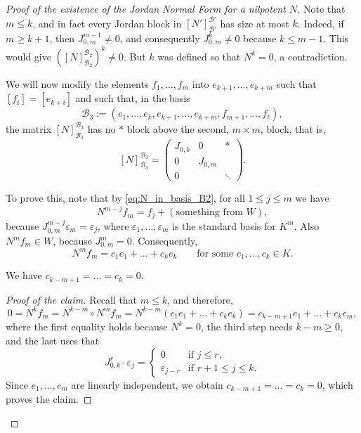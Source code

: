 \begin{proof}[Proof of the existence of the Jordan Normal Form for a nilpotent $N$]
Note that $m \le k$, and in fact every Jordan block in $[N']_{\mathcal{B}'}^{\mathcal{B}'}$ has size at most $k$. Indeed, if $m \ge k+1$, then $J_{0,m}^{m-1} \neq 0$, and consequently $J_{0,m}^{k} \neq 0$ because $k \le m-1$. This would give $\left([N]_{\mathcal{B}_2}^{\mathcal{B}_2}\right)^k \neq 0$. But $k$ was defined so that $N^k = 0$, a contradiction.

We will now modify the elements $f_1, \dots, f_m$ into $e_{k+1}, \dots, e_{k+m}$ such that $[f_i] = [e_{k+i}]$ and such that, in the basis
\[
    \mathcal{B}_3 := (e_1, \dots, e_k, e_{k+1}, \dots, e_{k+m}, f_{m+1}, \dots, f_\ell),
\]
the matrix $[N]_{\mathcal{B}_3}^{\mathcal{B}_3}$ has no $*$ block above the second, $m \times m$, block, that is,
\[
    [N]_{\mathcal{B}_3}^{\mathcal{B}_3} = \left(\begin{array}{c|c|c} J_{0,k} & 0 & * \\ \hline 0 & J_{0,m} & \\ 0 & & \ddots \end{array}\right).
\]

To prove this, note that by \eqref{eq:N_in_basis_B2}, for all $1 \le j \le m$ we have
\[
    N^{m-j} f_m = f_j + (\text{something from } W),
\]
because $J_{0,m}^{m-j} \varepsilon_m = \varepsilon_j$, where $\varepsilon_1, \dots, \varepsilon_m$ is the standard basis for $K^m$. Also $N^m f_m \in W$, because $J_{0,m}^m = 0$. Consequently,
\[
    N^m f_m = c_1 e_1 + \dots + c_k e_k \qquad \text{for some } c_1, \dots, c_k \in K.
\]

\begin{claim*}
\label{claim:top_coefficients_vanish}
We have $c_{k-m+1} = \dots = c_k = 0$.
\end{claim*}

\begin{proof}[Proof of the claim]
Recall that $m \le k$, and therefore,
\[
    0 = N^k f_m = N^{k-m} \circ N^m f_m = N^{k-m}\left(c_1 e_1 + \dots + c_k e_k\right) = c_{k-m+1} e_1 + \dots + c_k e_m,
\]
where the first equality holds because $N^k = 0$, the third step needs $k - m \ge 0$, and the last uses that
\[
    J_{0,k}^r \cdot \varepsilon_j = \begin{cases} 0 & \text{if } j \le r, \\ \varepsilon_{j-r} & \text{if } r+1 \le j \le k. \end{cases}
\]
Since $e_1, \dots, e_m$ are linearly independent, we obtain $c_{k-m+1} = \dots = c_k = 0$, which proves the claim.
\end{proof}


\end{proof}
